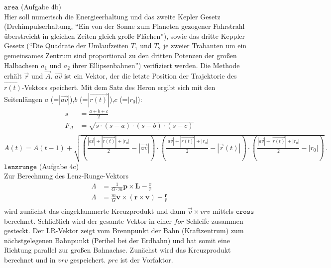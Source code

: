  	$\texttt{area}$ (Aufgabe 4b)\\
Hier soll numerisch die Energieerhaltung und das zweite Kepler Gesetz (Drehimpulserhaltung, \enquote{Ein von der Sonne zum Planeten gezogener Fahrstrahl überstreicht in gleichen Zeiten gleich große Flächen}), sowie das dritte Keppler Gesetz (\enquote{Die Quadrate der Umlaufzeiten $T_1$ und $T_2$ je zweier Trabanten um ein gemeinsames Zentrum sind proportional zu den dritten Potenzen der großen Halbachsen $a_1$ und $a_2$ ihrer Ellipsenbahnen}) verifiziert werden. Die Methode erhält $\vec{r}$ und $\vec{A}$. $\vec{\textit{av}}$ ist ein Vektor, der die letzte Position der Trajektorie des $\vec{r(t)}$-Vektors speichert. Mit dem Satz des Heron ergibt sich mit den Seitenlängen $a$ (=$|\vec{\textit{av}}|$),$b$ (=$|\vec{r(t)}|$),$c$ (=$|r_0|$):\\
\begin{equation*}
	\begin{split}
		s &= \frac{a+b+c}{2} \\
		F_{\Delta} &= \sqrt{s \cdot (s-a)\cdot (s-b) \cdot (s-c)} \\
	\end{split}
\end{equation*}
$
	A(t)= A(t-1) + \sqrt{\left( \frac{|\vec{\textit{av}}| + |\vec{r(t)}| + |r_0|}{2} - |\vec{\textit{av}}|\right)\cdot \left(\frac{|\vec{\textit{av}}| + |\vec{r(t)}| + |r_0|}{2}-|\vec{r}(t)|\right) \cdot \left( \frac{|\vec{\textit{av}}| + |\vec{r(t)}| + |r_0|}{2} - |r_0| \right)}\,. 
$\\

	$\texttt{lenzrunge}$ (Aufgabe 4c)\\
Zur Berechnung des Lenz-Runge-Vektors
\begin{equation*}
	\begin{split}
		\Lambda &= \frac{1}{G \cdot m} \textbf{p} \times \textbf{L} - \frac{\textbf{r}}{r} \\
		\Lambda &= \frac{m}{G} \textbf{v} \times (\textbf{r} \times \textbf{v}) - \frac{\textbf{r}}{r} \\
	\end{split}
\end{equation*}
wird zunächst das eingeklammerte Kreuzprodukt und dann $\vec{v} \times \textit{vrv}$ mittels $\texttt{cross}$ berechnet. Schließlich wird der gesamte Vektor in einer $\textit{for}$-Schleife zusammen gesteckt.
Der LR-Vektor zeigt vom Brennpunkt der Bahn (Kraftzentrum) zum nächstgelegenen Bahnpunkt (Perihel bei der Erdbahn) und hat somit eine Richtung parallel zur großen Bahnachse. 
Zunächst wird das Kreuzprodukt berechnet und in $\textit{vrv}$ gespeichert. $\textit{pre}$ ist der Vorfaktor.\\

